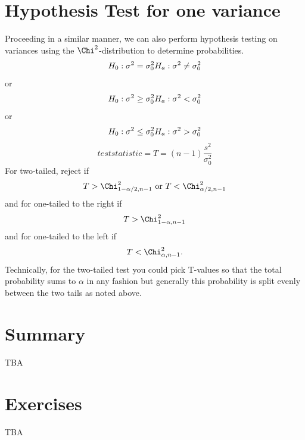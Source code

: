 \documentclass[10pt,]{book}
\numberwithin{equation}{section}
\newcommand{\lt}{<}
\newcommand{\gt}{>}
\begin{document}
\section[{Hypothesis Test for one variance}]{Hypothesis Test for one variance}\label{section-76}
\hypertarget{p-1203}{}%
Proceeding in a similar manner, we can also perform hypothesis testing on variances using the \(\Chi^2\)-distribution to determine probabilities.%
\begin{equation*}
H_0 : \sigma^2 = \sigma_0^2  \\ H_a: \sigma^2 \neq \sigma_0^2
\end{equation*}
or%
\begin{equation*}
H_0 : \sigma^2 \ge \sigma_0^2  \\ H_a: \sigma^2 \lt \sigma_0^2
\end{equation*}
or%
\begin{equation*}
H_0 : \sigma^2 \le \sigma_0^2  \\ H_a: \sigma^2 \gt \sigma_0^2
\end{equation*}
%
\begin{equation*}
test statistic = T = (n-1) \frac{s^2}{\sigma_0^2}
\end{equation*}
For two-tailed, reject if%
\begin{equation*}
T \gt \Chi_{1-\alpha/2,n-1}^2 \text{ or } T \lt \Chi_{\alpha/2,n-1}^2
\end{equation*}
and for one-tailed to the right if%
\begin{equation*}
T \gt \Chi_{1-\alpha,n-1}^2
\end{equation*}
and for one-tailed to the left if%
\begin{equation*}
T \lt \Chi_{\alpha,n-1}^2.
\end{equation*}
Technically, for the two-tailed test you could pick T-values so that the total probability sums to \(\alpha\) in any fashion but generally this probability is split evenly between the two tails as noted above.%
%
%
\typeout{************************************************}
\typeout{************************************************}
%
\section[{Summary}]{Summary}\label{section-77}
\hypertarget{p-1204}{}%
TBA%
%
%
\typeout{************************************************}
\typeout{************************************************}
%
\section[{Exercises}]{Exercises}\label{section-78}
\hypertarget{p-1205}{}%
TBA%
%
%
\typeout{************************************************}
\typeout{************************************************}
%
\end{document}
